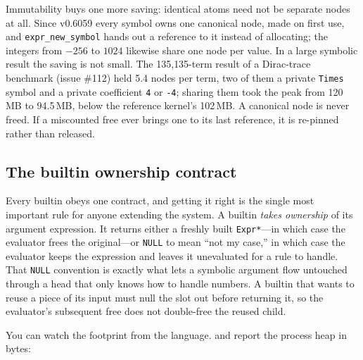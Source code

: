 Immutability buys one more saving: identical atoms need not be separate nodes at all.
Since v0.6059 every symbol owns one canonical node, made on first use, and
\texttt{expr\_new\_symbol} hands out a reference to it instead of allocating; the
integers from \(-256\) to \(1024\) likewise share one node per
value. In a large symbolic result the saving is not small.
The 135{,}135-term result of a Dirac-trace benchmark (issue \#112) held 5.4 nodes per
term, two of them a private
\texttt{Times} symbol and a private coefficient \texttt{4} or \texttt{-4}; sharing them
took the peak from 120\,MB to 94.5\,MB, below the reference kernel's 102\,MB. A canonical
node is never freed. If a miscounted free ever brings one to its last reference, it is
re-pinned rather than released.

\subsection*{The builtin ownership contract}

Every builtin obeys one contract, and getting it right is the single most important
rule for anyone extending the system. A builtin \emph{takes ownership} of its argument
expression. It returns either a freshly built \texttt{Expr*}---in which case the
evaluator frees the original---or \texttt{NULL} to mean ``not my case,'' in which case
the evaluator keeps the expression and leaves it unevaluated for a rule to handle. That
\texttt{NULL} convention is exactly what lets a symbolic argument flow untouched
through a head that only knows how to handle numbers. A builtin that wants to reuse a
piece of its input must null the slot out before returning it, so the evaluator's
subsequent free does not double-free the reused child.

You can watch the footprint from the language.  and 
report the process heap in bytes:


